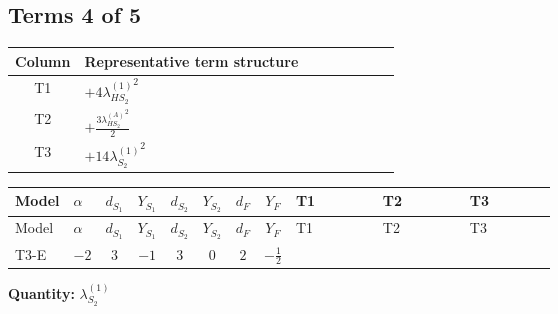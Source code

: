 \documentclass[8pt]{article}
\begin{document}
\begin{landscape}
\subsection*{Terms 4 of 5}
\begin{center}
\begin{tabular}{@{}c >{\raggedright\arraybackslash}p{0.82\linewidth}@{}}
\toprule
Column & Representative term structure \\
\midrule
T1 & \(\displaystyle +4 {\lambda_{HS_2}^{(1)}}^2\) \\
\midrule
T2 & \(\displaystyle +\frac{3 {\lambda_{HS_2}^{(A)}}^2}{2}\) \\
\midrule
T3 & \(\displaystyle +14 {\lambda_{S_2}^{(1)}}^2\) \\
\midrule
\bottomrule
\end{tabular}
\end{center}
\smallskip
\tiny
\begin{longtable}{@{}llcccccc >{\raggedright\arraybackslash}p{0.21\linewidth} >{\raggedright\arraybackslash}p{0.21\linewidth} >{\raggedright\arraybackslash}p{0.21\linewidth}@{}}
\toprule
Model & $\alpha$ & $d_{S_1}$ & $Y_{S_1}$ & $d_{S_2}$ & $Y_{S_2}$ & $d_F$ & $Y_F$ & T1 & T2 & T3 \\
\midrule
\endfirsthead
\toprule
Model & $\alpha$ & $d_{S_1}$ & $Y_{S_1}$ & $d_{S_2}$ & $Y_{S_2}$ & $d_F$ & $Y_F$ & T1 & T2 & T3 \\
\midrule
\endhead
T3-E & $-2$ & $3$ & $-1$ & $3$ & $0$ & $2$ & $-\frac{1}{2}$ & \scriptsize\adjustbox{max width=\linewidth}{$\begin{gathered} +4 {\lambda_{HS_2}^{(1)}}^2\end{gathered}$} & \scriptsize\adjustbox{max width=\linewidth}{$\begin{gathered} +\frac{3 {\lambda_{HS_2}^{(A)}}^2}{2}\end{gathered}$} & \scriptsize\adjustbox{max width=\linewidth}{$\begin{gathered} +14 {\lambda_{S_2}^{(1)}}^2\end{gathered}$} \\
\midrule
\bottomrule
\end{longtable}
\clearpage
\noindent\textbf{Quantity: }$\lambda_{S_2}^{(1)}$\par\smallskip

\end{landscape}
\end{document}
